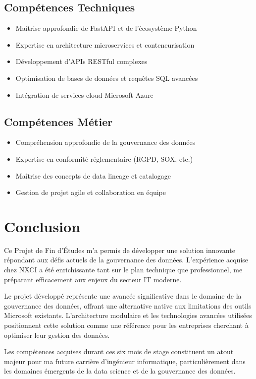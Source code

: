 \documentclass[12pt,a4paper]{article}
\begin{document}
\subsection{Compétences Techniques}

\begin{itemize}
    \item Maîtrise approfondie de FastAPI et de l'écosystème Python
    \item Expertise en architecture microservices et conteneurisation
    \item Développement d'APIs RESTful complexes
    \item Optimisation de bases de données et requêtes SQL avancées
    \item Intégration de services cloud Microsoft Azure
\end{itemize}

\subsection{Compétences Métier}

\begin{itemize}
    \item Compréhension approfondie de la gouvernance des données
    \item Expertise en conformité réglementaire (RGPD, SOX, etc.)
    \item Maîtrise des concepts de data lineage et catalogage
    \item Gestion de projet agile et collaboration en équipe
\end{itemize}

\section{Conclusion}

Ce Projet de Fin d'Études m'a permis de développer une solution innovante répondant aux défis actuels de la gouvernance des données. L'expérience acquise chez NXCI a été enrichissante tant sur le plan technique que professionnel, me préparant efficacement aux enjeux du secteur IT moderne.

Le projet développé représente une avancée significative dans le domaine de la gouvernance des données, offrant une alternative native aux limitations des outils Microsoft existants. L'architecture modulaire et les technologies avancées utilisées positionnent cette solution comme une référence pour les entreprises cherchant à optimiser leur gestion des données.

Les compétences acquises durant ces six mois de stage constituent un atout majeur pour ma future carrière d'ingénieur informatique, particulièrement dans les domaines émergents de la data science et de la gouvernance des données.
\end{document}

